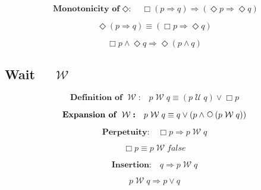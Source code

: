 \documentclass[fleqn, leqno]{article}
\newcommand{\impl}{\ensuremath{\Rightarrow}}        %
\newcommand{\Until}{\;\mathcal{U}\;}
\newcommand{\Wait}{\;\mathcal{W}\;}
\newcommand{\Next}{\;\,\text{\raisebox{3.5pt}{\circle{6}}}}
\newcommand{\Event}{\Diamond}
\newcommand{\Always}{\Box}
\newcommand{\spacer}{\vspace{-30pt}}
\newcommand{\firstspacer}{\vspace{-26pt}}
\begin{document}
\spacer

\begin{equation}\label{E:alwaysImpEvents}
\textbf{Monotonicity of $\Event$:}\quad \Always (p \impl q) \impl (\Event p \impl \Event q)
\end{equation}

\spacer

\begin{equation}\label{E:eventImpAlways}
\Event (p \impl q) \equiv (\Always p \impl \Event q)
\end{equation}

\spacer

\begin{equation}\label{E:alwaysAndEvent}
\Always p \land \Event q \impl \Event (p \land q)
\end{equation}

\subsection*{Wait $\quad\Wait$}

\begin{equation}\label{E:defWait}
\textbf{Definition of $\Wait$:}\quad p \Wait q \equiv (p \Until q) \lor \Always p
\end{equation}

\firstspacer

\begin{equation}\label{E:expansionWait}
\textbf{Expansion of $\Wait$:}\quad p \Wait q \equiv q \lor (p \land \Next (p \Wait q))
\end{equation}

\spacer

\begin{equation}\label{E:alwaysImpWait}
\textbf{Perpetuity:}\quad \Always p \Rightarrow p \Wait q
\end{equation}

\spacer

\begin{equation}\label{E:alwaysAsWait}
\Always p \equiv p \Wait false
\end{equation}

\spacer

\begin{equation}\label{E:waitInsertion}
\textbf{Insertion:}\quad q \impl p \Wait q
\end{equation}

\spacer

\begin{equation}\label{E:waitToOr}
p \Wait q \impl p \lor q
\end{equation}
\end{document}
